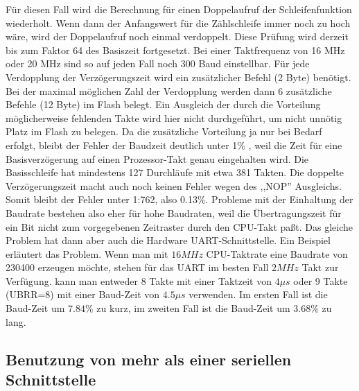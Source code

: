 Für diesen Fall wird die Berechnung für einen Doppelaufruf der Schleifenfunktion wiederholt. 
Wenn dann der Anfangswert für die Zählschleife immer noch zu hoch wäre, wird der Doppelaufruf noch einmal
verdoppelt. Diese Prüfung wird derzeit bis zum Faktor 64 des Basiszeit fortgesetzt.
Bei einer Taktfrequenz von 16 MHz oder 20 MHz sind so auf jeden Fall noch 300 Baud einstellbar.
Für jede Verdopplung der Verzögerungszeit wird ein zusätzlicher Befehl (2 Byte) benötigt. 
Bei der maximal möglichen Zahl der Verdopplung werden dann 6 zusätzliche Befehle (12 Byte) im Flash belegt.
Ein Ausgleich der durch die Vorteilung möglicherweise fehlenden Takte wird hier nicht durchgeführt,
um nicht unnötig Platz im Flash zu belegen.
Da die zusätzliche Vorteilung ja nur bei Bedarf erfolgt, bleibt der Fehler der Baudzeit deutlich unter 1\% ,
weil die Zeit für eine Basisverzögerung auf einen Prozessor-Takt genau eingehalten wird.
Die Basisschleife hat mindestens 127 Durchläufe mit etwa 381 Takten. Die doppelte Verzögerungszeit
macht auch noch keinen Fehler wegen des ,,NOP'' Ausgleichs. Somit bleibt der Fehler unter 1:762,
also 0.13\%. Probleme mit der Einhaltung der Baudrate bestehen also eher für hohe Baudraten,
weil die Übertragungszeit für ein Bit nicht zum vorgegebenen Zeitraster durch den CPU-Takt paßt.
Das gleiche Problem hat dann aber auch die Hardware UART-Schnittstelle.
Ein Beispiel erläutert das Problem.
Wenn man mit \(16 MHz\) CPU-Taktrate eine Baudrate von 230400 erzeugen möchte, 
stehen für das UART im besten Fall \(2 MHz\) Takt zur Verfügung.
kann man entweder 8 Takte mit einer Taktzeit von \(4 \mu s\) oder 9 Takte (UBRR=8)
mit einer Baud-Zeit von \(4.5\mu s\) verwenden. Im ersten Fall ist die Baud-Zeit
um \(7.84\%\) zu kurz, im zweiten Fall ist die Baud-Zeit um \(3.68\%\) zu lang.


\subsection{Benutzung von mehr als einer seriellen Schnittstelle}

